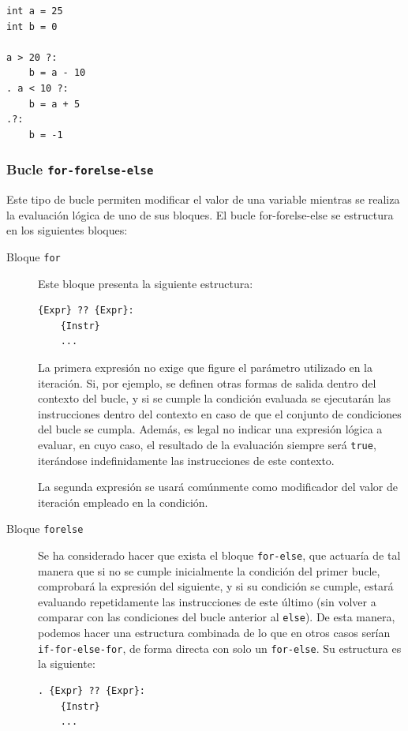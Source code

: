 \documentclass[11pt, english]{article}
\begin{document}
\begin{lstlisting}[caption=Ejemplo de uso de la sentencia \texttt{if-ifelse-else}]
int a = 25
int b = 0

a > 20 ?:
	b = a - 10
. a < 10 ?:
	b = a + 5
.?:
	b = -1
\end{lstlisting}

\subsubsection{Bucle \texttt{for-forelse-else}}
Este tipo de bucle permiten modificar el valor de una variable mientras se realiza la evaluación lógica de uno de sus bloques. El bucle for-forelse-else se estructura en los siguientes bloques:

\begin{description}
	\item[Bloque \texttt{for}] Este bloque presenta la siguiente estructura:
	\begin{center}
\begin{lstlisting}
{Expr} ?? {Expr}:
	{Instr}
	...
\end{lstlisting}
	\end{center}
	
	La primera expresión no exige que figure el parámetro utilizado en la iteración. Si, por ejemplo, se definen otras formas de salida dentro del contexto del bucle, y si se cumple la condición evaluada se ejecutarán las instrucciones dentro del contexto en caso de que el conjunto de condiciones del bucle se cumpla. Además, es legal no indicar una expresión lógica a evaluar, en cuyo caso, el resultado de la evaluación siempre será \texttt{true}, iterándose indefinidamente las instrucciones de este contexto. 

	La segunda expresión se usará comúnmente como modificador del valor de iteración empleado en la condición.
	
	\item[Bloque \texttt{forelse}] Se ha considerado hacer que exista el bloque \texttt{for-else}, que actuaría de tal manera que si no se cumple inicialmente la condición del primer bucle, comprobará la expresión del siguiente, y si su condición se cumple, estará evaluando repetidamente las instrucciones de este último (sin volver a comparar con las condiciones del bucle anterior al \texttt{else}). De esta manera, podemos hacer una estructura combinada de lo que en otros casos serían \texttt{if-for-else-for}, de forma directa con solo un \texttt{for-else}. \vspace{10px}Su estructura es la siguiente:
	\begin{center}
\begin{lstlisting}
. {Expr} ?? {Expr}:
	{Instr}
	...
\end{lstlisting}
	\end{center}
	

\end{description}
\end{document}
